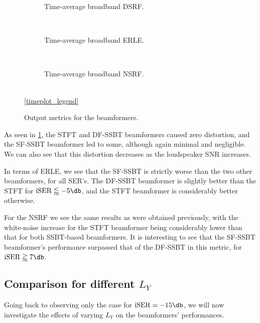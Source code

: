 
\begin{figure}[!t]
	\centering
	\begin{subfigure}{\textwidth}
		\centering
		
		\caption{Time-average broadband DSRF.}
		\label{subfig:lineplot_dsrf_32_avg_acc_v7}
	\end{subfigure}\\[1em]
	\begin{subfigure}{\textwidth}
		\centering
		
		\caption{Time-average broadband ERLE.}
		\label{subfig:lineplot_erle_32_avg_acc_v7}
	\end{subfigure}\\[1em]
	\begin{subfigure}{\textwidth}
		\centering
		
		\caption{Time-average broadband NSRF.}
		\label{subfig:lineplot_nsrf_32_avg_acc_v7}
	\end{subfigure}\\[1em]
	\ref*{timeplot_legend}
	\caption{Output metrics for the beamformers.}
	\label{fig:lineplots_32_avg_acc_v7}
\end{figure}

As seen in \cref{subfig:lineplot_dsrf_32_avg_acc_v7}, the STFT and DF-SSBT beamformers caused zero distortion, and the SF-SSBT beamformer led to some, although again minimal and negligible. We can also see that this distortion decreases as the loudspeaker SNR increases.

In terms of ERLE, we see that the SF-SSBT is strictly worse than the two other beamformers, for all SER's. The DF-SSBT beamformer is slightly better than the STFT for $\iser \lessapprox -5\dB$, and the STFT beamformer is considerably better otherwise.

For the NSRF we see the same results as were obtained previously, with the white-noise increase for the STFT beamformer being considerably lower than that for both SSBT-based beamformers. It is interesting to see that the SF-SSBT beamformer's performance surpassed that of the DF-SSBT in this metric, for $\iser \gtrapprox 7\dB$.

\subsection{Comparison for different $L_Y$}

Going back to observing only the case for $\iser = -15\dB$, we will now investigate the effects of varying $L_Y$ on the beamformers' performances.

